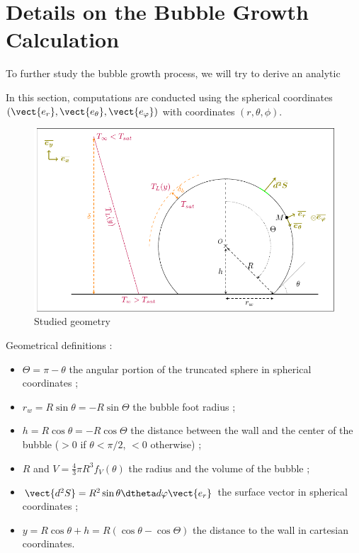 
\chapter{Details on the Bubble Growth Calculation}


To further study the bubble growth process, we will try to derive an analytic

In this section, computations are conducted using the spherical coordinates $\left(\vect{e_{r}}, \vect{e_{\theta}}, \vect{e_{\varphi}}\right)$ with coordinates $(r, \theta, \phi)$. 

\begin{figure}[h!]
\centering
\includegraphics[width=0.7\linewidth]{img/growth/growth_analytical.pdf}
\caption{Studied geometry}
\label{fig:anal_growth}
\end{figure}

\npar
Geometrical definitions :
\begin{itemize}
\item $\Theta=\pi - \theta$ the angular portion of the truncated sphere in spherical coordinates ;
\item $r_{w}=R\sin{\theta}=-R\sin{\Theta}$ the bubble foot radius ;
\item $h=R\cos{\theta}=-R\cos{\Theta}$ the distance between the wall and the center of the bubble ($>0$ if $\theta < \pi/2$, $<0$ otherwise) ;
\item $R$ and $V=\frac{4}{3}\pi R^{3} f_{V}\left(\theta\right)$ the radius and the volume of the bubble ;
\item $\vect{d^{2}S}=R^{2}\sin{\theta}\dtheta d\varphi \vect{e_{r}}$ the surface vector in spherical coordinates ;
\item $y=R\cos{\theta}+h = R\left(\cos{\theta} - \cos{\Theta}\right)$ the distance to the wall in cartesian coordinates.
\end{itemize}


